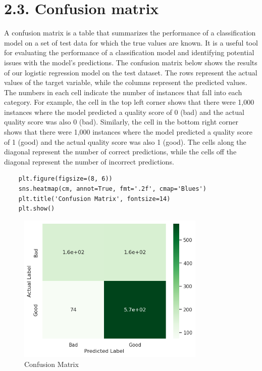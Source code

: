 \documentclass{report}
\begin{document}
\section*{2.3. Confusion matrix}
A confusion matrix is a table that summarizes the performance of a classification model on a set of test data for which the true values are known. It is a useful tool for evaluating the performance of a classification model and identifying potential issues with the model's predictions. The confusion matrix below shows the results of our logistic regression model on the test dataset. The rows represent the actual values of the target variable, while the columns represent the predicted values. The numbers in each cell indicate the number of instances that fall into each category. For example, the cell in the top left corner shows that there were 1,000 instances where the model predicted a quality score of 0 (bad) and the actual quality score was also 0 (bad). Similarly, the cell in the bottom right corner shows that there were 1,000 instances where the model predicted a quality score of 1 (good) and the actual quality score was also 1 (good). The cells along the diagonal represent the number of correct predictions, while the cells off the diagonal represent the number of incorrect predictions.\\

\begin{lstlisting}
    plt.figure(figsize=(8, 6))
    sns.heatmap(cm, annot=True, fmt='.2f', cmap='Blues')
    plt.title('Confusion Matrix', fontsize=14)
    plt.show()
\end{lstlisting}


\begin{figure}
    \centering
    \includegraphics[width=0.8\textwidth]{images/22.png}
    \caption{Confusion Matrix}
    \label{fig:Confusion Matrix}
\end{figure}
\end{document}
